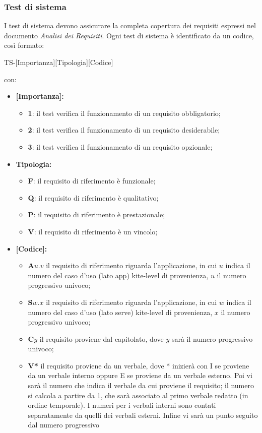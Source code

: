 \subsubsection{Test di sistema}
I test di sistema devono assicurare la completa copertura dei requisiti espressi nel documento \textit{Analisi dei Requisiti}.
Ogni test di sistema è identificato da un codice, così formato:
\begin{center}
    TS-[Importanza][Tipologia][Codice]
\end{center}
con:
\begin{itemize}
    \item \textbf{[Importanza]:}
    \begin{itemize}
        \item \textbf{1}: il test verifica il funzionamento di un requisito obbligatorio;
        \item \textbf{2}: il test verifica il funzionamento di un requisito desiderabile;
        \item \textbf{3}: il test verifica il funzionamento di un requisito opzionale;
    \end{itemize}
    \item \textbf{{Tipologia}:}
    \begin{itemize}
        \item \textbf{F}: il requisito di riferimento è funzionale;
        \item \textbf{Q}: il requisito di riferimento è qualitativo;
        \item \textbf{P}: il requisito di riferimento è prestazionale;
        \item \textbf{V}: il requisito di riferimento è un vincolo;
    \end{itemize}
    \item \textbf{[Codice]:}
    \begin{itemize}
        \item \textbf{A$u.v$} il requisito di riferimento riguarda l'applicazione, in cui $u$ indica il numero del caso d'uso (lato app) kite-level di provenienza, $u$ il numero progressivo univoco;
        \item \textbf{S$w.x$} il requisito di riferimento riguarda l'applicazione, in cui $w$ indica il numero del caso d'uso (lato serve) kite-level di provenienza, $x$ il numero progressivo univoco;
        \item \textbf{C$y$} il requisito proviene dal capitolato, dove $y$ sarà il numero progressivo univoco;
        \item \textbf{V*} il requisito proviene da un verbale, dove * inizierà con I se proviene da un verbale interno oppure E se proviene da un verbale esterno. Poi vi sarà il numero che indica il verbale da cui proviene il requisito; il numero si calcola a partire da 1, che sarà associato al primo verbale redatto (in ordine temporale). I numeri per i verbali interni sono contati separatamente da quelli dei verbali esterni. Infine vi sarà un punto seguito dal numero progressivo

\end{itemize}
\end{itemize}

